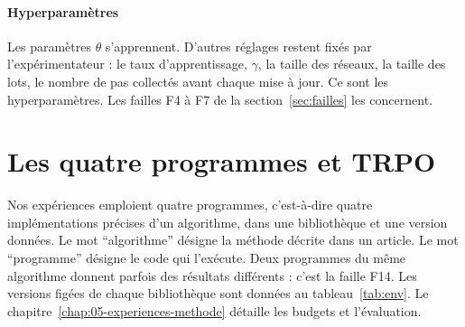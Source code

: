 \paragraph{Hyperparamètres}
Les paramètres $\theta$ s'apprennent. D'autres réglages restent fixés par l'expérimentateur : le taux
d'apprentissage, $\gamma$, la taille des réseaux, la taille des lots, le nombre de pas collectés avant
chaque mise à jour. Ce sont les hyperparamètres. Les failles F4 à F7 de la section~\ref{sec:failles} les
concernent.

\section{Les quatre programmes et TRPO}\label{sec:ctx-programmes}

Nos expériences emploient quatre programmes, c'est-à-dire quatre implémentations précises d'un
algorithme, dans une bibliothèque et une version données. Le mot \enquote{algorithme} désigne la
méthode décrite dans un article. Le mot \enquote{programme} désigne le code qui l'exécute. Deux
programmes du même algorithme donnent parfois des résultats différents : c'est la faille F14. Les
versions figées de chaque bibliothèque sont données au tableau~\ref{tab:env}. Le chapitre~\ref{chap:05-experiences-methode}
détaille les budgets et l'évaluation.

